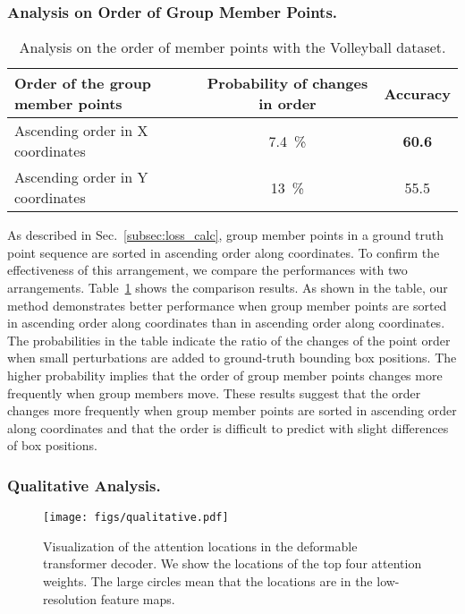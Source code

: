\documentclass[runningheads]{llncs}
\begin{document}
\subsubsection{Analysis on Order of Group Member Points.}\label{subsec:order}
\begin{table}[t]
  \caption{Analysis on the order of member points with the Volleyball dataset.}
  \label{table:analysis_order}
  \centering
  \setlength{\tabcolsep}{8pt}
  \begin{tabular}{@{}lcc@{}}
   \toprule
   Order of the group member points & Probability of changes in order & Accuracy \\
   \midrule
   Ascending order in X coordinates & \SI{7.4}{\percent} & \textbf{60.6} \\
   Ascending order in Y coordinates & \SI{13}{\percent} & 55.5 \\
   \bottomrule
  \end{tabular}
  \vspace{-1.0em}
\end{table}

As described in Sec.~\ref{subsec:loss_calc}, group member points in a ground truth point sequence are sorted in ascending order along  coordinates. To confirm the effectiveness of this arrangement, we compare the performances with two arrangements. Table~\ref{table:analysis_order} shows the comparison results. As shown in the table, our method demonstrates better performance when group member points are sorted in ascending order along  coordinates than in ascending order along  coordinates. The probabilities in the table indicate the ratio of the changes of the point order when small perturbations are added to ground-truth bounding box positions. The higher probability implies that the order of group member points changes more frequently when group members move. These results suggest that the order changes more frequently when group member points are sorted in ascending order along  coordinates and that the order is difficult to predict with slight differences of box positions.
 
\subsubsection{Qualitative Analysis.}

\begin{figure}[t]
 \centering
 \texttt{[image: figs/qualitative.pdf]}
 \caption{Visualization of the attention locations in the deformable transformer decoder. We show the locations of the top four attention weights. The large circles mean that the locations are in the low-resolution feature maps.}\label{fig:qualitative}
 \vspace{-1.0ex}
\end{figure}
\end{document}
